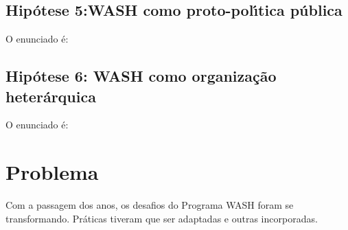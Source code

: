 \documentclass[
12pt,		%
openright,	%
twoside,  %
a4paper,			%
chapter=TITLE,		%
english,			%
french,				%
spanish,			%
brazil				%
]{USPSC-classe/USPSC}
\begin{document}
\subsection[Hip\'otese 5:WASH como proto-pol\'{\i}tica p\'ublica]{Hip\'otese 5:WASH como proto-pol\'{\i}tica p\'ublica}\label{Hip\'otese 5:WASH como proto-pol\'{\i}tica p\'ublica}
O enunciado \'e:


















\noindent\begin{center}\mbox{\centering{}}\end{center}


\subsection[Hip\'otese 6: WASH como organiza\c{c}\~ao heter\'arquica]{Hip\'otese 6: WASH como organiza\c{c}\~ao heter\'arquica}\label{Hip\'otese 6: WASH como organiza\c{c}\~ao heter\'arquica}
O enunciado \'e:


















\noindent\begin{center}\mbox{\centering{}}\end{center}


\section[Problema]{Problema}\label{Problema}
Com a passagem dos anos, os desafios do Programa WASH foram se transformando. Pr\'aticas tiveram que ser adaptadas e outras incorporadas.
\end{document}
